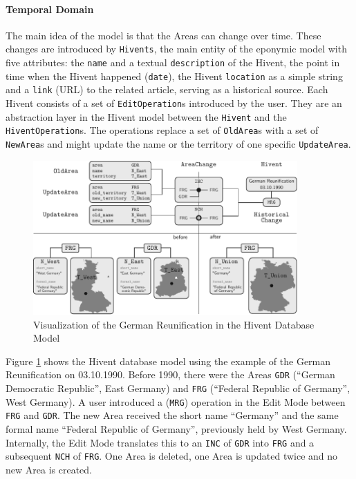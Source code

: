 
\paragraph{Temporal Domain} %
\label{par:temporal_domain}

The main idea of the model is that the Areas can change over time. These changes are introduced by \texttt{Hivents}, the main entity of the eponymic model with five attributes: the \texttt{name} and a textual \texttt{description} of the Hivent, the point in time when the Hivent happened (\texttt{date}), the Hivent \texttt{location} as a simple string and a \texttt{link} (URL) to the related article, serving as a historical source.
Each Hivent consists of a set of \texttt{EditOperation}s introduced by the user.
They are an abstraction layer in the Hivent model between the \texttt{Hivent} and the \texttt{HiventOperation}s.
The operations replace a set of \texttt{OldArea}s with a set of \texttt{NewArea}s and might update the name or the territory of one specific \texttt{UpdateArea}.



\begin{figure}[ht]
  \vspace{1.5em}
  \includegraphics[width=0.9\textwidth]{graphics/development/implementation/example_reunification}
  \caption{Visualization of the German Reunification in the Hivent Database Model}
  \label{fig:database_example_reunification}
\end{figure}

Figure \ref{fig:database_example_reunification} shows the Hivent database model using the example of the German Reunification on 03.10.1990. Before 1990, there were the Areas \texttt{GDR} (``German Democratic Republic'', East Germany) and \texttt{FRG} (``Federal Republic of Germany'', West Germany). A user introduced a (\texttt{MRG}) operation in the Edit Mode between \texttt{FRG} and \texttt{GDR}. The new Area received the short name ``Germany'' and the same formal name ``Federal Republic of Germany'', previously held by West Germany. Internally, the Edit Mode translates this to an \texttt{INC} of \texttt{GDR} into \texttt{FRG} and a subsequent \texttt{NCH} of \texttt{FRG}. One Area is deleted, one Area is updated twice and no new Area is created.

